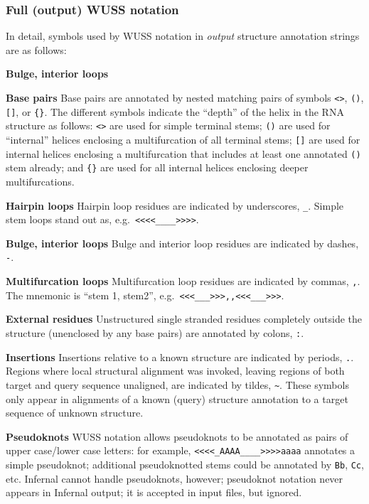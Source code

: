 \subsubsection{Full (output) WUSS notation}

In detail, symbols used by WUSS notation in \emph{output} structure
annotation strings are as follows:

\begin{sreitems}{\textbf{Bulge, interior loops}}
\item[\textbf{Base pairs}]
  Base pairs are annotated by nested matching pairs of symbols
  \verb+<>+, \verb+()+, \verb+[]+, or \verb+{}+.
  The different symbols indicate the ``depth'' of the
  helix in the RNA structure as follows:
  \verb+<>+ are used for simple terminal stems; 
  \verb+()+ are used for ``internal'' helices enclosing a multifurcation of
  all terminal stems; \verb+[]+ are used for internal helices 
  enclosing a multifurcation that includes at least one annotated
  \verb+()+ stem already; and \verb+{}+ are used for all internal
  helices enclosing deeper multifurcations.
   
\item[\textbf{Hairpin loops}]
  Hairpin loop residues are indicated by underscores, \verb+_+.
  Simple stem loops stand out as, e.g.\ \verb+<<<<____>>>>+.

\item[\textbf{Bulge, interior loops}]
  Bulge and interior loop residues are indicated by dashes, \verb+-+.
  
\item[\textbf{Multifurcation loops}]
  Multifurcation loop residues are indicated by commas, \verb+,+.
  The mnemonic is ``stem 1, stem2'', e.g.\ \verb+<<<___>>>,,<<<___>>>+.

\item[\textbf{External residues}]
  Unstructured single stranded residues completely outside the
  structure (unenclosed by any base pairs) are annotated by
  colons, \verb+:+.

\item[\textbf{Insertions}]
  Insertions relative to a known structure are indicated by periods,
  \verb+.+. Regions where local structural alignment was invoked,
  leaving regions of both target and query sequence unaligned,
  are indicated by tildes, \verb+~+. These symbols only appear in
  alignments of a known (query) structure annotation to a target
  sequence of unknown structure.

\item[\textbf{Pseudoknots}]
  WUSS notation allows pseudoknots to be annotated as pairs of
  upper case/lower case letters: for example,
  \verb+<<<<_AAAA____>>>>aaaa+ annotates a simple pseudoknot;
  additional pseudoknotted stems could be annotated by \verb+Bb+,
  \verb+Cc+, etc. Infernal cannot handle pseudoknots, however;
  pseudoknot notation never appears in Infernal output; it
  is accepted in input files, but ignored.
\end{sreitems}

